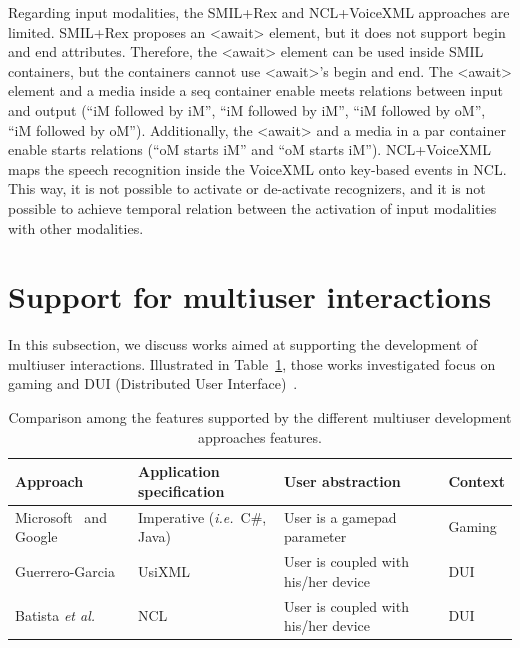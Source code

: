 \documentclass[
  doutorado,
  american
]{ThesisPUC}
\newcommand{\tab}[1]{Table~\ref{#1}}
\begin{document}
Regarding input modalities, the SMIL+Rex and NCL+VoiceXML approaches are
limited. SMIL+Rex proposes an <await> element, but it does not support begin and
end attributes. Therefore, the <await> element can be used inside SMIL
containers, but the containers cannot use <await>’s begin and end. The <await>
element and a media inside a seq container enable meets relations between input
and output (“iM followed by iM”, “iM followed by iM”, “iM followed by oM”, “iM
followed by oM”). Additionally, the <await> and a media in a par container
enable starts relations (“oM starts iM” and “oM starts iM”). NCL+VoiceXML maps
the speech recognition inside the VoiceXML onto key-based events in NCL.
This way, it is not possible to activate or de-activate recognizers, and it is
not possible to achieve temporal relation between the activation of input
modalities with other modalities.

\section{Support for multiuser interactions}
\label{sec:state:multiuser}

In this subsection, we discuss works aimed at supporting the development of
multiuser interactions. Illustrated in \tab{table:multiuser}, those works
investigated focus on gaming and DUI (Distributed User 
Interface)~\cite{elmqvist_distributed_2011}.

\begin{table}[ht]
\scriptsize
\def\arraystretch{1.5}
\begin{tabular}{ m{3.5cm} m{3cm} m{4.5cm} m{1.3cm} }
	\hline
	\textbf{Approach} & \textbf{Application} \newline 
	\textbf{specification} & \textbf{User} \newline 
	\textbf{abstraction} & Context	\\
	\hline
	Microsoft~\cite{microsoft_getting_nodate} and \newline 
	Google~\cite{google_supporting_nodate} &	
	Imperative \newline (\textit{i.e.}~C\#, Java) &	User 
	is a gamepad parameter & Gaming \\
	\hline
	Guerrero-Garcia~\cite{guerrero_garcia_designing_2010} &	UsiXML & User is
	coupled with his/her device & DUI \\
	\hline
	Batista \textit{et al.}~\cite{batista_estendendo_2010,batista_ginga-md:_2013} 
	&	NCL & User is coupled with his/her device & DUI \\
	\hline
\end{tabular}
\caption{Comparison among the features supported by the different multiuser 
development approaches features.}
\label{table:multiuser}
\end{table}
\end{document}
